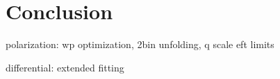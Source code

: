 \chapter{Conclusion}
\label{ch:conclusion}

polarization:
wp optimization, 2bin unfolding, q scale
eft limits

differential:
extended fitting
